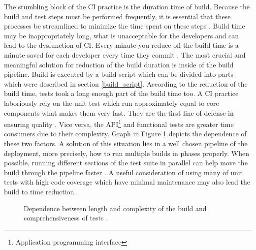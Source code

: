 The stumbling block of the CI practice is the duration time of build. Because the build and test steps must be performed frequently, it is essential that these processes be streamlined to minimize the time spent on these steps \cite{DigitalOceanCI}. Build time may be inappropriately long, what is unacceptable for the developers and can lead to the dysfunction of CI. Every minute you reduce off the build time is a minute saved for each developer every time they commit \cite{MartinFowler}. The most crucial and meaningful solution for reduction of the build duration is inside of the build pipeline. Build is executed by a build script which can be divided into parts which were described in section \ref{build_script}. According to the reduction of the build time, tests took a long enough part of the build time too. A CI practice laboriously rely on the unit test which run approximately equal to core components what makes them very fast. They are the first line of defense in ensuring quality \cite{CI_atlassian}. Vice versa, the API\footnote{Application programming interface} and functional tests are greater time consumers due to their complexity. Graph in Figure \ref{fig:grap_dependence} depicts the dependence of these two factors. A solution of this situation lies in a well chosen pipeline of the deployment, more  precisely, how to run multiple builds in phases properly. When possible, running different sections of the test suite in parallel can help move the build through the pipeline faster \cite{DigitalOceanCI}. A useful consideration of using many of unit tests with high code coverage which have minimal maintenance may also lead the build to time reduction.

\begin{figure}[H]
    \centering
    \caption{Dependence between length and complexity of the build and comprehensiveness of tests \cite{deployment_automation}.}
    \label{fig:grap_dependence}
\end{figure}

